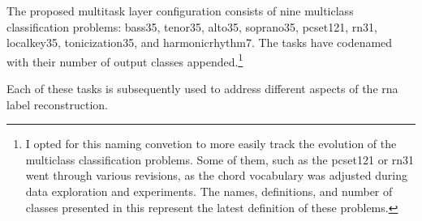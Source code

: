 
The proposed multitask layer configuration consists of nine
multiclass classification problems: \gls{bass35},
\gls{tenor35}, \gls{alto35}, \gls{soprano35},
\gls{pcset121}, \gls{rn31}, \gls{localkey35},
\gls{tonicization35}, and \gls{harmonicrhythm7}. The tasks
have codenamed with their number of output classes
appended.\footnote{I opted for this naming convetion to more
easily track the evolution of the multiclass classification
problems. Some of them, such as the \gls{pcset121} or
\gls{rn31} went through various revisions, as the chord
vocabulary was adjusted during data exploration and
experiments. The names, definitions, and number of classes
presented in this \thesisdiss{} represent the latest
definition of these problems.}

Each of these tasks is subsequently used to address
different aspects of the \gls{rna} label reconstruction.
